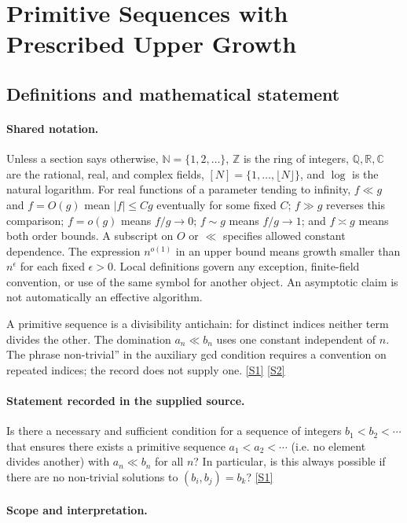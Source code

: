 \documentclass[11pt,a4paper]{article}
\newcommand{\N}{\mathbb{N}}
\newcommand{\Z}{\mathbb{Z}}
\newcommand{\Q}{\mathbb{Q}}
\newcommand{\R}{\mathbb{R}}
\newcommand{\C}{\mathbb{C}}
\newcommand{\sref}[2]{\hyperlink{source:#1:#2}{[S#2]}}
\begin{document}
\section{Primitive Sequences with Prescribed Upper Growth}\label{statement}


\subsection{Definitions and mathematical statement}

\paragraph{Shared notation.}Unless a section says otherwise, $\N=\{1,2,\ldots\}$,
$\Z$ is the ring of integers, $\Q,\R,\C$ are the rational, real, and complex
fields, $[N]=\{1,\ldots,\lfloor N\rfloor\}$, and $\log$ is the natural
logarithm. For real functions of a parameter tending to infinity,
$f\ll g$ and $f=O(g)$ mean $|f|\leq Cg$ eventually for some fixed $C$;
$f\gg g$ reverses this comparison; $f=o(g)$ means $f/g\to0$;
$f\sim g$ means $f/g\to1$; and $f\asymp g$ means both order bounds.
A subscript on $O$ or $\ll$ specifies allowed constant dependence.
The expression $n^{o(1)}$ in an upper bound means growth smaller than
$n^\epsilon$ for each fixed $\epsilon>0$. Local definitions govern any
exception, finite-field convention, or use of the same symbol for another
object. An asymptotic claim is not automatically an effective algorithm.



A primitive sequence is a divisibility antichain: for distinct indices neither term divides the other. The domination $a_n\ll b_n$ uses one constant independent of $n$. The phrase non-trivial'' in the auxiliary gcd condition requires a convention on repeated indices; the record does not supply one. \sref{statement}{1} \sref{statement}{2}

\paragraph{Statement recorded in the supplied source.}
Is there a necessary and sufficient condition for a sequence of integers $b_1<b_2<\cdots$ that ensures there exists a primitive sequence $a_1<a_2<\cdots$ (i.e. no element divides another) with $a_n \ll b_n$ for all $n$?
In particular, is this always possible if there are no non-trivial solutions to $(b_i,b_j)=b_k$? \sref{statement}{1}

\paragraph{Scope and interpretation.}
\end{document}

